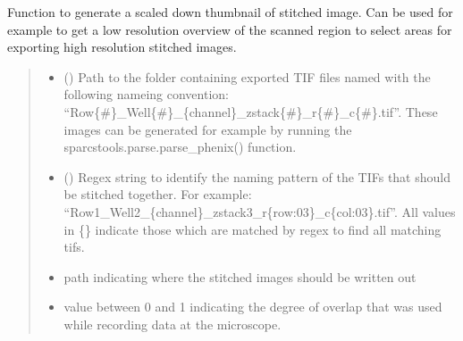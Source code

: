 \documentclass[a4paper,10pt,english,openany,oneside]{sphinxmanual}
\begin{document}
\begin{fulllineitems}
\label{\detokenize{pages/modules:sparcstools.stitch.generate_thumbnail}}
\pysigstartsignatures
{}
\pysigstopsignatures
\sphinxAtStartPar
Function to generate a scaled down thumbnail of stitched image. Can be used for example to
get a low resolution overview of the scanned region to select areas for exporting high resolution
stitched images.
\begin{quote}\begin{description}
\begin{itemize}
\item {} 
\sphinxAtStartPar
{} () \textendash{} Path to the folder containing exported TIF files named with the following nameing convention: “Row\{\#\}\_Well\{\#\}\_\{channel\}\_zstack\{\#\}\_r\{\#\}\_c\{\#\}.tif”.
These images can be generated for example by running the sparcstools.parse.parse\_phenix() function.

\item {} 
\sphinxAtStartPar
{} () \textendash{} Regex string to identify the naming pattern of the TIFs that should be stitched together.
For example: “Row1\_Well2\_\{channel\}\_zstack3\_r\{row:03\}\_c\{col:03\}.tif”.
All values in \{\} indicate those which are matched by regex to find all matching tifs.

\item {} 
\sphinxAtStartPar
{} \textendash{} path indicating where the stitched images should be written out

\item {} 
\sphinxAtStartPar
{} \textendash{} value between 0 and 1 indicating the degree of overlap that was used while recording data at the microscope.


\end{itemize}
\end{description}
\end{quote}
\end{fulllineitems}
\end{document}
